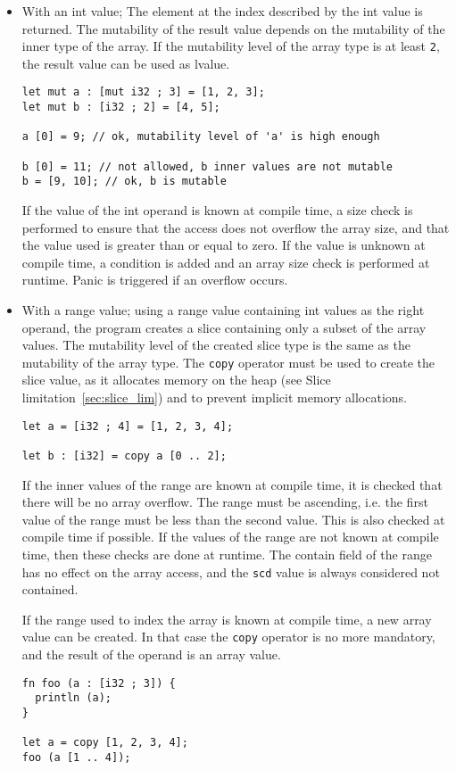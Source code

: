 \begin{itemize}
\item With an int value; The element at the index described by the int value is
  returned. The mutability of the result value depends on the mutability of the
  inner type of the array. If the mutability level of the array type is at least
  \texttt{2}, the result value can be used as lvalue.

  \begin{lstlisting}[style=coloredverbatim]
let mut a : [mut i32 ; 3] = [1, 2, 3];
let mut b : [i32 ; 2] = [4, 5];

a [0] = 9; // ok, mutability level of 'a' is high enough

b [0] = 11; // not allowed, b inner values are not mutable
b = [9, 10]; // ok, b is mutable
  \end{lstlisting}

  If the value of the int operand is known at compile time, a size check is
  performed to ensure that the access does not overflow the array size, and that
  the value used is greater than or equal to zero. If the value is unknown at
  compile time, a condition is added and an array size check is performed at
  runtime. Panic is triggered if an overflow occurs.


\item With a range value; using a range value containing int values as the right
  operand, the program creates a slice containing only a subset of the array
  values. The mutability level of the created slice type is the same as the
  mutability of the array type. The \texttt{copy} operator must be used to create
  the slice value, as it allocates memory on the heap (see Slice
  limitation~\ref{sec:slice_lim}) and to prevent implicit memory allocations.

  \begin{lstlisting}[style=coloredverbatim]
let a = [i32 ; 4] = [1, 2, 3, 4];

let b : [i32] = copy a [0 .. 2];
  \end{lstlisting}

  If the inner values of the range are known at compile time, it is checked that
  there will be no array overflow. The range must be ascending, i.e. the first
  value of the range must be less than the second value. This is also checked at
  compile time if possible. If the values of the range are not known at compile
  time, then these checks are done at runtime. The contain field of the range
  has no effect on the array access, and the \texttt{scd} value is always
  considered not contained.

  If the range used to index the array is known at compile time, a new array
  value can be created. In that case the \texttt{copy} operator is no more
  mandatory, and the result of the operand is an array value.

  \begin{lstlisting}[style=coloredverbatim]
fn foo (a : [i32 ; 3]) {
  println (a);
}

let a = copy [1, 2, 3, 4];
foo (a [1 .. 4]);
  \end{lstlisting}

\end{itemize}

